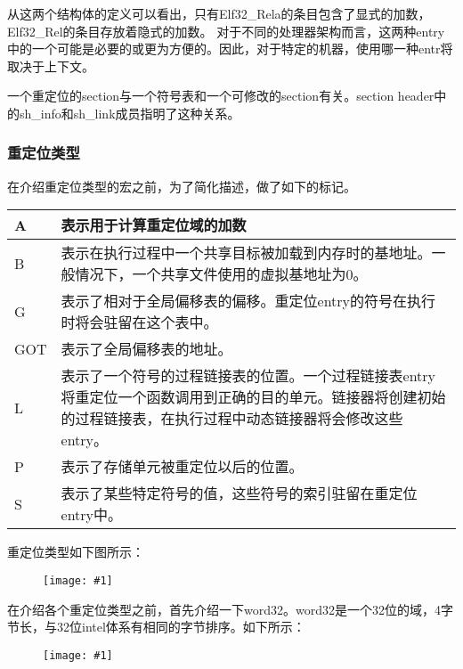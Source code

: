 \documentclass[a4paper,left=2.5cm,right=2.5cm,11pt]{article}
\newcommand{\fic}[1]{\begin{figure}[H]
		\center
		\texttt{[image: \#1]}
	\end{figure}}
\newcommand{\interval}{\vspace{0.5em}}
\begin{document}
	从这两个结构体的定义可以看出，只有Elf32\_Rela的条目包含了显式的加数，Elf32\_Rel的条目存放着隐式的加数。
	对于不同的处理器架构而言，这两种entry中的一个可能是必要的或更为方便的。因此，对于特定的机器，使用哪一种entr将取决于上下文。\par

	一个重定位的section与一个符号表和一个可修改的section有关。section header中的sh\_info和sh\_link成员指明了这种关系。

\subsubsection{重定位类型}
	在介绍重定位类型的宏之前，为了简化描述，做了如下的标记。

	\interval
	\begin{longtable}{p{2cm}p{9cm}}
	\hline
	A & 表示用于计算重定位域的加数 \\
	\hline
	B & 表示在执行过程中一个共享目标被加载到内存时的基地址。一般情况下，一个共享文件使用的虚拟基地址为0。\\
	\hline
	G & 表示了相对于全局偏移表的偏移。重定位entry的符号在执行时将会驻留在这个表中。\\
	\hline
	GOT & 表示了全局偏移表的地址。\\
	\hline
	L & 表示了一个符号的过程链接表的位置。一个过程链接表entry将重定位一个函数调用到正确的目的单元。链接器将创建初始的过程链接表，在执行过程中动态链接器将会修改这些entry。\\
	\hline
	P & 表示了存储单元被重定位以后的位置。\\
	\hline
	S & 表示了某些特定符号的值，这些符号的索引驻留在重定位entry中。\\
	\hline
	\end{longtable}
	\interval

	重定位类型如下图所示：
	\fic{21.png}

	在介绍各个重定位类型之前，首先介绍一下word32。word32是一个32位的域，4字节长，与32位intel体系有相同的字节排序。如下所示：
	\fic{22.png}
\end{document}
